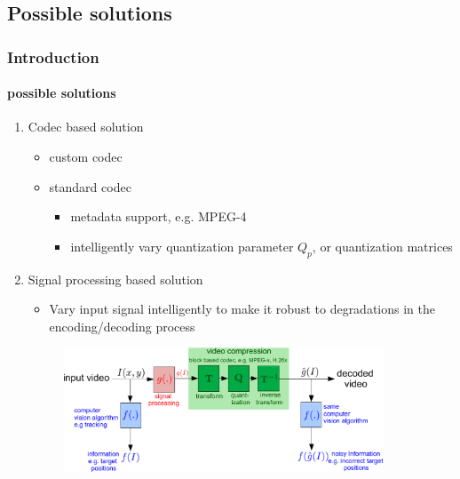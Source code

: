 \subsection{Possible solutions}
\begin{frame}
\frametitle{Introduction}
\framesubtitle{possible solutions}
\logoCSIPCPL\mypagenum
	\begin{enumerate}
		\item Codec based solution
			\begin{itemize}
				\item custom codec
				\item standard codec
					\begin{itemize}
						\item metadata support, e.g. MPEG-4
						\item intelligently vary quantization parameter $Q_p$, or quantization matrices
					\end{itemize}
			\end{itemize}
		\item Signal processing based solution
			\begin{itemize}
				\item Vary input signal intelligently to make it robust to degradations in the encoding/decoding process
			\end{itemize}
			\begin{figure}
				\includegraphics[width=0.9\textwidth]{figs/ICIP2009_SolutionThroughSigProc.pdf}
			\end{figure}
	\end{enumerate}
\end{frame}



